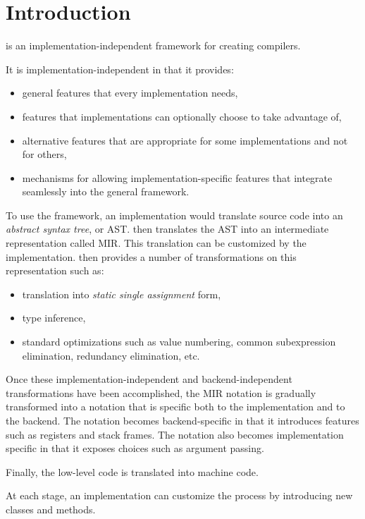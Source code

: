 \chapter{Introduction}
%

\sysname{} is an implementation-independent framework for creating
\cl{} compilers. 

It is implementation-independent in that it provides:

\begin{itemize}
\item general features that every implementation needs,
\item features that implementations can optionally choose to take
  advantage of, 
\item alternative features that are appropriate for some
  implementations and not for others,
\item mechanisms for allowing implementation-specific features that
  integrate seamlessly into the general framework.
\end{itemize}

To use the framework, an implementation would translate source code
into an \emph{abstract syntax tree}, or AST.
\sysname{} then translates the AST into an intermediate representation
called MIR.  
This translation can be customized by the implementation.
\sysname{} then provides a number of transformations on this
representation such as:

\begin{itemize}
\item translation into \emph{static single assignment} form,
\item type inference,
\item standard optimizations such as value numbering, common
  subexpression elimination, redundancy elimination, etc.
\end{itemize}

Once these implementation-independent and backend-independent
transformations have been accomplished, the MIR notation is gradually
transformed into a notation that is specific both to the
implementation and to the backend.  The notation becomes
backend-specific in that it introduces features such as registers and
stack frames.  The notation also becomes implementation specific in
that it exposes choices such as argument passing.

Finally, the low-level code is translated into machine code.

At each stage, an implementation can customize the process by
introducing new classes and methods. 

